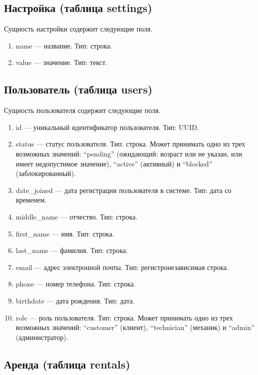 \subsection{Настройка (таблица settings)}

Сущность настройки содержит следующие поля.

\begin{enumerate}
	\item name --- название. Тип: строка.
	\item value --- значение. Тип: текст.
\end{enumerate}

\subsection{Пользователь (таблица users)}

Сущность пользователя содержит следующие поля.

\begin{enumerate}
	\item id --- уникальный идентификатор пользователя. Тип: UUID.
	\item status --- статус пользователя. Тип: строка. Может принимать одно из трех
	      возможных значений: \enquote{pending} (ожидающий: возраст или не указан, или
	      имеет недопустимое значение), \enquote{active} (активный) и \enquote{blocked}
	      (заблокированный).
	\item date\_joined --- дата регистрации пользователя в системе. Тип: дата со
	      временем.
	\item middle\_name --- отчество. Тип: строка.
	\item first\_name --- имя. Тип: строка.
	\item last\_name --- фамилия. Тип: строка.
	\item email --- адрес электронной почты. Тип: регистронезависимая строка.
	\item phone --- номер телефона. Тип: строка.
	\item birthdate --- дата рождения. Тип: дата.
	\item role --- роль пользователя. Тип: строка. Может принимать одно из трех возможных
	      значений: \enquote{customer} (клиент), \enquote{technician} (механик) и
	      \enquote{admin} (администратор).
\end{enumerate}

\subsection{Аренда (таблица rentals)}


